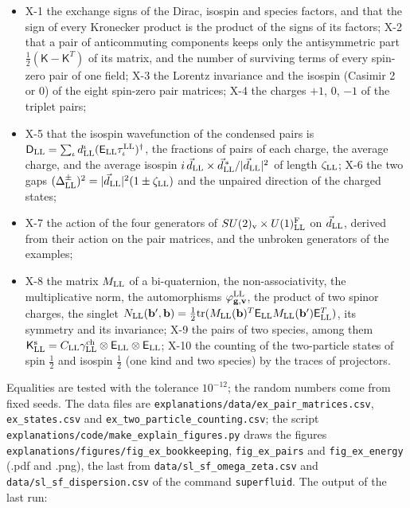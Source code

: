 \documentclass[
  10pt,
]{article}
\providecommand{\tightlist}{%
  \setlength{\itemsep}{0pt}\setlength{\parskip}{0pt}}
\begin{document}
\begin{itemize}
\tightlist
\item
  X-1 the exchange signs of the Dirac, isospin and species factors, and
  that the sign of every Kronecker product is the product of the signs
  of its factors; X-2 that a pair of anticommuting components keeps only
  the antisymmetric part \(\tfrac12(\mathsf K-\mathsf K^T)\) of its
  matrix, and the number of surviving terms of every spin-zero pair of
  one field; X-3 the Lorentz invariance and the isospin (Casimir 2 or 0)
  of the eight spin-zero pair matrices; X-4 the charges \(+1\), 0,
  \(-1\) of the triplet pairs;
\item
  X-5 that the isospin wavefunction of the condensed pairs is
  \(\mathsf D_{\rm LL}=\sum_\iota d^\iota_{\rm LL}(\mathsf E_{\rm LL}\tau^{\rm LL}_\iota)^\dagger\),
  the fractions of pairs of each charge, the average charge, and the
  average isospin
  \(i\,\vec d_{\rm LL}\times\vec d^{\,*}_{\rm LL}/\lvert\vec d_{\rm LL}\rvert^2\)
  of length \(\zeta_{\rm LL}\); X-6 the two gaps
  \((\Delta^\pm_{\rm LL})^2=\lvert\vec d_{\rm LL}\rvert^2(1\pm\zeta_{\rm LL})\)
  and the unpaired direction of the charged states;
\item
  X-7 the action of the four generators of
  \(SU(2)_{\rm v}\times U(1)^{\rm F}_{\rm LL}\) on \(\vec d_{\rm LL}\),
  derived from their action on the pair matrices, and the unbroken
  generators of the examples;
\item
  X-8 the matrix \(M_{\rm LL}\) of a bi-quaternion, the
  non-associativity, the multiplicative norm, the automorphisms
  \(\varphi^{\rm LL}_{\mathbf g,\mathbf v}\), the product of two spinor
  charges, the singlet
  \(N_{\rm LL}(\mathbf b',\mathbf b)=\tfrac12\mathrm{tr}(M_{\rm LL}(\mathbf b)^T\mathsf E_{\rm LL}M_{\rm LL}(\mathbf b')\mathsf E_{\rm LL}^T)\),
  its symmetry and its invariance; X-9 the pairs of two species, among
  them
  \(\mathsf K^{\rm s}_{\rm LL}=C_{\rm LL}\gamma^{\rm ch}_{\rm LL}\otimes\mathsf E_{\rm LL}\otimes\mathsf E_{\rm LL}\);
  X-10 the counting of the two-particle states of spin \(\tfrac12\) and
  isospin \(\tfrac12\) (one kind and two species) by the traces of
  projectors.
\end{itemize}

Equalities are tested with the tolerance \(10^{-12}\); the random
numbers come from fixed seeds. The data files are
\texttt{explanations/data/ex\_pair\_matrices.csv},
\texttt{ex\_states.csv} and \texttt{ex\_two\_particle\_counting.csv};
the script \texttt{explanations/code/make\_explain\_figures.py} draws
the figures \texttt{explanations/figures/fig\_ex\_bookkeeping},
\texttt{fig\_ex\_pairs} and \texttt{fig\_ex\_energy} (.pdf and .png),
the last from \texttt{data/sl\_sf\_omega\_zeta.csv} and
\texttt{data/sl\_sf\_dispersion.csv} of the command \texttt{superfluid}.
The output of the last run:
\end{document}
